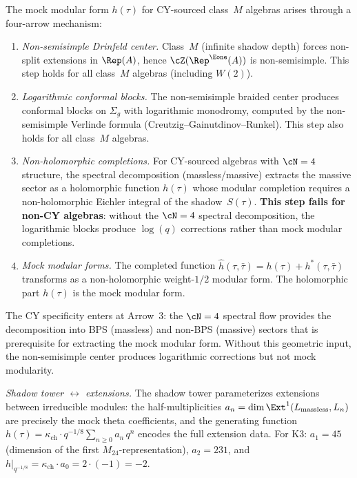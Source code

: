 \begin{remark}
\label{rem:four-arrow-mock-mechanism}
The mock modular form $h(\tau)$ for CY-sourced class~$M$ algebras arises through a four-arrow mechanism:
\begin{enumerate}[label=\textup{(\arabic*)}, leftmargin=4em]
\item \emph{Non-semisimple Drinfeld center.} Class~$M$ (infinite shadow depth) forces non-split extensions in $\Rep(A)$, hence $\cZ(\Rep^{\Eone}(A))$ is non-semisimple. This step holds for all class~$M$ algebras (including $W(2)$).
\item \emph{Logarithmic conformal blocks.} The non-semisimple braided center produces conformal blocks on $\Sigma_g$ with logarithmic monodromy, computed by the non-semisimple Verlinde formula (Creutzig--Gainutdinov--Runkel). This step also holds for all class~$M$ algebras.
\item \emph{Non-holomorphic completions.} For CY-sourced algebras with $\cN = 4$ structure, the spectral decomposition (massless/massive) extracts the massive sector as a holomorphic function $h(\tau)$ whose modular completion requires a non-holomorphic Eichler integral of the shadow~$S(\tau)$. \textbf{This step fails for non-CY algebras}: without the $\cN = 4$ spectral decomposition, the logarithmic blocks produce $\log(q)$ corrections rather than mock modular completions.
\item \emph{Mock modular forms.} The completed function $\hat{h}(\tau, \bar\tau) = h(\tau) + h^*(\tau, \bar\tau)$ transforms as a non-holomorphic weight-$1/2$ modular form. The holomorphic part $h(\tau)$ is the mock modular form.
\end{enumerate}
The CY specificity enters at Arrow~3: the $\cN = 4$ spectral flow provides the decomposition into BPS (massless) and non-BPS (massive) sectors that is prerequisite for extracting the mock modular form. Without this geometric input, the non-semisimple center produces logarithmic corrections but not mock modularity.

\smallskip\noindent
\textit{Shadow tower $\leftrightarrow$ extensions.} The shadow tower parameterizes extensions between irreducible modules: the half-multiplicities $a_n = \dim \Ext^1(L_{\mathrm{massless}}, L_n)$ are precisely the mock theta coefficients, and the generating function $h(\tau) = \kappa_{\mathrm{ch}} \cdot q^{-1/8} \sum_{n \geq 0} a_n\,q^n$ encodes the full extension data. For K3: $a_1 = 45$ (dimension of the first $M_{24}$-representation), $a_2 = 231$, and $h|_{q^{-1/8}} = \kappa_{\mathrm{ch}} \cdot a_0 = 2 \cdot (-1) = -2$.

\smallskip\noindent
\end{remark}

